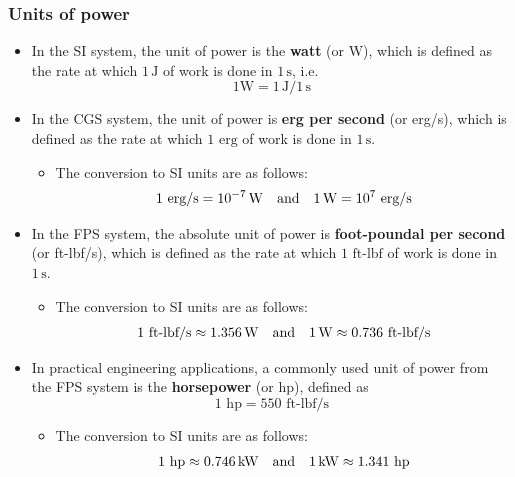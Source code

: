 		\subsubsection{Units of power}
			\begin{itemize}
				\item In the SI system, the unit of power is the \textbf{watt} (or W), which is defined as the rate at which $1\,\unit{\joule}$ of work is done in $1\,\unit{\second}$, i.e.
				$$1\unit{\watt}=1\,\unit{\joule}/1\,\unit{\second}$$
				
				\item In the CGS system, the unit of power is \textbf{erg per second} (or erg/s), which is defined as the rate at which $1\text{ erg}$ of work is done in $1\,\unit{\second}$.
				\begin{itemize}
					\item The conversion to SI units are as follows:
					\begin{align*}
						1\text{ erg/s}=\num{e-7}\,\unit{\watt}\qq{and}1\,\unit{\watt}=\num{e7}\text{ erg/s}
					\end{align*}
				\end{itemize}
				
				\item In the FPS system, the absolute unit of power is \textbf{foot-poundal per second} (or ft-lbf/s), which is defined as the rate at which $1\text{ ft-lbf}$ of work is done in $1\,\unit{\second}$.
				\begin{itemize}
					\item The conversion to SI units are as follows:
					\begin{align*}
						1\text{ ft-lbf/s}\approx 1.356\,\unit{\watt}\qq{and}1\,\unit{\watt}\approx 0.736\text{ ft-lbf/s}
					\end{align*}
				\end{itemize}
				
				\item In practical engineering applications, a commonly used unit of power from the FPS system is the \textbf{horsepower} (or hp), defined as
				$$1\text{ hp}=550\text{ ft-lbf/s}$$
				\begin{itemize}
					\item The conversion to SI units are as follows:
					\begin{align*}
						1\text{ hp}\approx 0.746\,\unit{\kilo\watt}\qq{and}1\,\unit{\kilo\watt}\approx 1.341\text{ hp}
					\end{align*}
				\end{itemize}
			\end{itemize}
			
